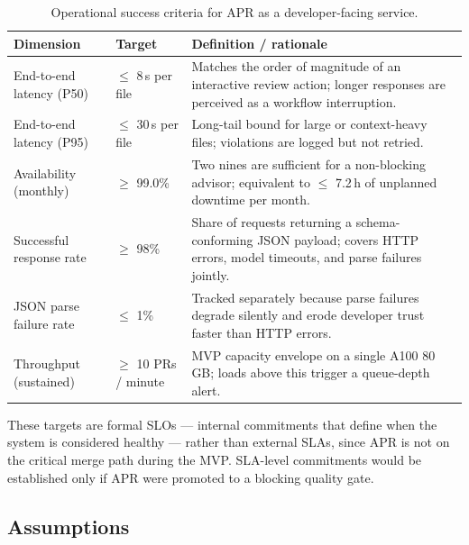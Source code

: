 \documentclass[11pt]{article}
\begin{document}
\begin{table}[H]
\centering
\caption{Operational success criteria for APR as a developer-facing service.}
\label{tab:operational_criteria}
\begin{tabular}{@{}p{4.0cm}p{3.5cm}p{6.5cm}@{}}
\toprule
\textbf{Dimension} & \textbf{Target} & \textbf{Definition / rationale} \\ \midrule
End-to-end latency (P50) & $\leq$ 8\,s per file & Matches the order of magnitude of an interactive review action; longer responses are perceived as a workflow interruption. \\ \midrule
End-to-end latency (P95) & $\leq$ 30\,s per file & Long-tail bound for large or context-heavy files; violations are logged but not retried. \\ \midrule
Availability (monthly) & $\geq$ 99.0\% & Two nines are sufficient for a non-blocking advisor; equivalent to $\leq$ 7.2\,h of unplanned downtime per month. \\ \midrule
Successful response rate & $\geq$ 98\% & Share of requests returning a schema-conforming JSON payload; covers HTTP errors, model timeouts, and parse failures jointly. \\ \midrule
JSON parse failure rate & $\leq$ 1\% & Tracked separately because parse failures degrade silently and erode developer trust faster than HTTP errors. \\ \midrule
Throughput (sustained) & $\geq$ 10 PRs / minute & MVP capacity envelope on a single A100 80\,GB; loads above this trigger a queue-depth alert. \\ \bottomrule
\end{tabular}
\end{table}

These targets are formal SLOs — internal commitments that define when the system is considered healthy — rather than external SLAs, since APR is not on the critical merge path during the MVP. SLA-level commitments would be established only if APR were promoted to a blocking quality gate.

\subsection*{Assumptions}
\end{document}
